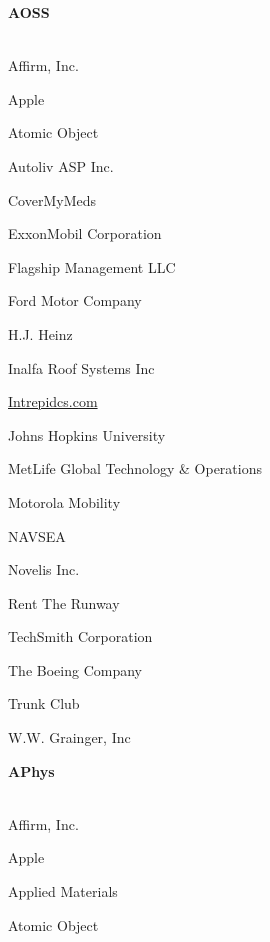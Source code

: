 \documentclass[twoside]{article}
\begin{document}
\begin{center}
\begin{multicols}{5}
\begin{FlushLeft}
        \end{FlushLeft}
        \vspace{1em}
        {\fontsize{14}{16}\selectfont \bf AOSS}\\
        \vspace{-1em}
        ~\hrulefill~
        \vspace{-.9em}
        \begin{FlushLeft}
        \begin{compactitem}
        \item Affirm, Inc.
\item Apple
\item Atomic Object
\item Autoliv ASP Inc.
\item CoverMyMeds
\item ExxonMobil Corporation
\item Flagship Management LLC
\item Ford Motor Company
\item H.J. Heinz
\item Inalfa Roof Systems Inc
\item \url{Intrepidcs.com}
\item Johns Hopkins University
\item MetLife Global Technology \& Operations
\item Motorola Mobility
\item NAVSEA
\item Novelis Inc.
\item Rent The Runway
\item TechSmith Corporation
\item The Boeing Company
\item Trunk Club
\item W.W. Grainger, Inc
\end{compactitem}
        \end{FlushLeft}
        \vspace{1em}
        {\fontsize{14}{16}\selectfont \bf APhys}\\
        \vspace{-1em}
        ~\hrulefill~
        \vspace{-.9em}
        \begin{FlushLeft}
        \begin{compactitem}
        \item Affirm, Inc.
\item Apple
\item Applied Materials
\item Atomic Object

\end{compactitem}
\end{FlushLeft}
\end{multicols}
\end{center}
\end{document}
